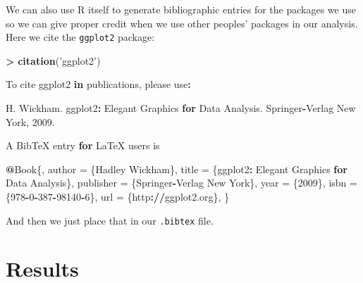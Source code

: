 \documentclass[]{article}
\newenvironment{Shaded}{\begin{snugshade}}{\end{snugshade}}
\newcommand{\KeywordTok}[1]{\textcolor[rgb]{0.13,0.29,0.53}{\textbf{#1}}}
\newcommand{\DecValTok}[1]{\textcolor[rgb]{0.00,0.00,0.81}{#1}}
\newcommand{\StringTok}[1]{\textcolor[rgb]{0.31,0.60,0.02}{#1}}
\newcommand{\ControlFlowTok}[1]{\textcolor[rgb]{0.13,0.29,0.53}{\textbf{#1}}}
\newcommand{\OperatorTok}[1]{\textcolor[rgb]{0.81,0.36,0.00}{\textbf{#1}}}
\newcommand{\ErrorTok}[1]{\textcolor[rgb]{0.64,0.00,0.00}{\textbf{#1}}}
\newcommand{\NormalTok}[1]{#1}
\begin{document}
We can also use R itself to generate bibliographic entries for the
packages we use so we can give proper credit when we use other peoples'
packages in our analysis. Here we cite the \texttt{ggplot2} package:

\begin{Shaded}
\begin{Highlighting}[]
\OperatorTok{>}\StringTok{ }\KeywordTok{citation}\NormalTok{(}\StringTok{'ggplot2'}\NormalTok{)}

\NormalTok{To cite ggplot2 }\ControlFlowTok{in}\NormalTok{ publications, please use}\OperatorTok{:}

\StringTok{  }\NormalTok{H. Wickham. ggplot2}\OperatorTok{:}\StringTok{ }\NormalTok{Elegant Graphics }\ControlFlowTok{for}\NormalTok{ Data Analysis. Springer}\OperatorTok{-}\NormalTok{Verlag New York, }\DecValTok{2009}\NormalTok{.}

\NormalTok{A BibTeX entry }\ControlFlowTok{for}\NormalTok{ LaTeX users is}

  \OperatorTok{@}\NormalTok{Book\{,}
\NormalTok{    author =}\StringTok{ }\NormalTok{\{Hadley Wickham\},}
\NormalTok{    title =}\StringTok{ }\NormalTok{\{ggplot2}\OperatorTok{:}\StringTok{ }\NormalTok{Elegant Graphics }\ControlFlowTok{for}\NormalTok{ Data Analysis\},}
\NormalTok{    publisher =}\StringTok{ }\NormalTok{\{Springer}\OperatorTok{-}\NormalTok{Verlag New York\},}
\NormalTok{    year =}\StringTok{ }\NormalTok{\{}\DecValTok{2009}\NormalTok{\},}
\NormalTok{    isbn =}\StringTok{ }\NormalTok{\{}\DecValTok{978}\OperatorTok{-}\DecValTok{0}\OperatorTok{-}\DecValTok{387}\OperatorTok{-}\DecValTok{98140}\OperatorTok{-}\DecValTok{6}\NormalTok{\},}
\NormalTok{    url =}\StringTok{ }\NormalTok{\{http}\OperatorTok{:}\ErrorTok{//}\NormalTok{ggplot2.org\},}
\NormalTok{  \}}
\end{Highlighting}
\end{Shaded}

And then we just place that in our \texttt{.bibtex} file.

\section{Results}\label{results}
\end{document}
